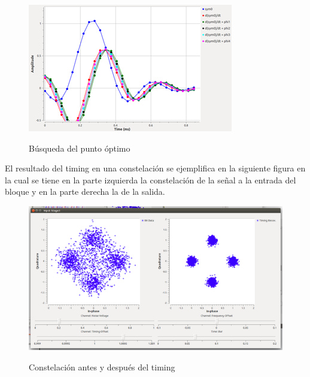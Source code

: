 \begin{figure}[h!]
	\captionsetup{justification = raggedright, singlelinecheck = false}
	\caption{Búsqueda del punto óptimo} 
	\centering
	\includegraphics[scale=1.2]{Imagenes/Timing.png}
	\label{fig:Timing}
\end{figure}

El resultado del timing en una constelación se ejemplifica en la siguiente figura en la cual se tiene en la parte izquierda la constelación de la señal a la entrada del bloque y en la parte derecha la de la salida. \\

\begin{figure}[h!]
	\captionsetup{justification = raggedright, singlelinecheck = false}
	\caption{Constelación antes y después del timing} 
	\centering
	\includegraphics[scale=1]{Imagenes/Resultados-timing.png}
	\label{fig:Resultados-timing}
\end{figure}

